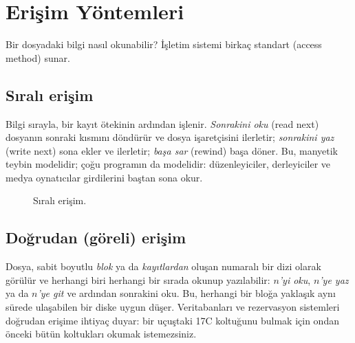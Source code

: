 \section{Erişim Yöntemleri}

Bir dosyadaki bilgi nasıl okunabilir? İşletim sistemi birkaç standart  (access method) sunar.

\subsection{Sıralı erişim}

Bilgi sırayla, bir kayıt ötekinin ardından işlenir. \emph{Sonrakini oku} (read next) dosyanın sonraki kısmını döndürür ve dosya işaretçisini ilerletir; \emph{sonrakini yaz} (write next) sona ekler ve ilerletir; \emph{başa sar} (rewind) başa döner. Bu, manyetik teybin modelidir; çoğu programın da modelidir: düzenleyiciler, derleyiciler ve medya oynatıcılar girdilerini baştan sona okur.

\begin{figure}[H]
\centering
{}
\caption{Sıralı erişim.}
\end{figure}

\subsection{Doğrudan (göreli) erişim}

Dosya, sabit boyutlu \emph{blok} ya da \emph{kayıtlardan} oluşan numaralı bir dizi olarak görülür ve herhangi biri herhangi bir sırada okunup yazılabilir: \emph{$n$'yi oku}, \emph{$n$'ye yaz} ya da \emph{$n$'ye git} ve ardından sonrakini oku. Bu, herhangi bir bloğa yaklaşık aynı sürede ulaşabilen bir diske uygun düşer. Veritabanları ve rezervasyon sistemleri doğrudan erişime ihtiyaç duyar: bir uçuştaki 17C koltuğunu bulmak için ondan önceki bütün koltukları okumak istemezsiniz.


